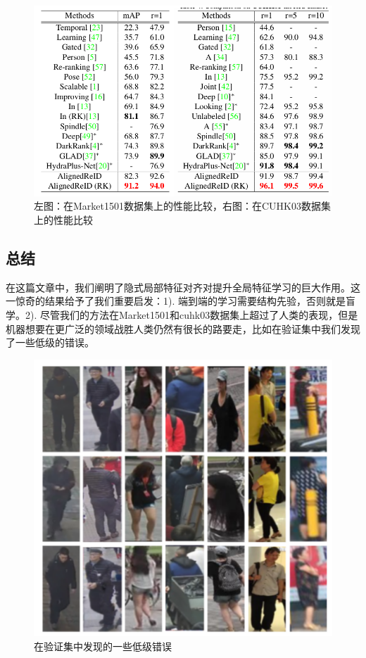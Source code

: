 \begin{figure}
	\centering
	\captionsetup{width=.88\linewidth}
	\includegraphics[width=.85\linewidth,keepaspectratio]{data/waiwenfanyi/compare.png}
	\caption{\kaiti 左图：在Market1501数据集上的性能比较，右图：在CUHK03数据集上的性能比较}
	\label{figure:compare}
\end{figure}

\subsection{总结}
在这篇文章中，我们阐明了隐式局部特征对齐对提升全局特征学习的巨大作用。这一惊奇的结果给予了我们重要启发：1). 端到端的学习需要结构先验，否则就是盲学。2). 尽管我们的方法在Market1501和cuhk03数据集上超过了人类的表现，但是机器想要在更广泛的领域战胜人类仍然有很长的路要走，比如在验证集中我们发现了一些低级的错误。

\begin{figure}
	\centering
	\captionsetup{width=.88\linewidth}
	\includegraphics[width=.6\linewidth,keepaspectratio]{data/waiwenfanyi/bad.png}
	\caption{\kaiti 在验证集中发现的一些低级错误}
	\label{figure:bad}
\end{figure}

